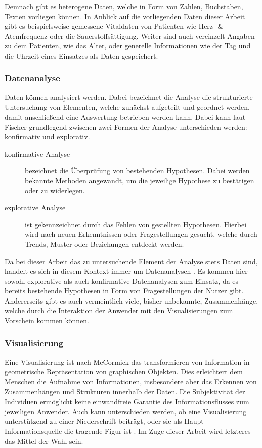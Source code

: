 Demnach gibt es heterogene Daten, welche in Form von Zahlen, Buchstaben, Texten vorliegen können.
In Anblick auf die vorliegenden Daten dieser Arbeit gibt es beispielsweise gemessene Vitaldaten von Patienten wie Herz- \& Atemfrequenz oder die Sauerstoffsättigung.
Weiter sind auch vereinzelt Angaben zu dem Patienten, wie das Alter, oder generelle Informationen wie der Tag und die Uhrzeit eines Einsatzes als Daten gespeichert.
 
\subsubsection{Datenanalyse}
\label{subsub:datenanalyse}
Daten können analysiert werden.
Dabei bezeichnet die Analyse die strukturierte Untersuchung von Elementen, welche zunächst aufgeteilt und geordnet werden, damit anschließend eine Auswertung betrieben werden kann.
Dabei kann laut Fischer \cite{Fischer.2014} grundlegend zwischen zwei Formen der Analyse unterschieden werden: konfirmativ und explorativ.
\begin{description}
\item[konfirmative Analyse] bezeichnet die Überprüfung von bestehenden Hypothesen.
Dabei werden bekannte Methoden angewandt, um die jeweilige Hypothese zu bestätigen oder zu widerlegen.
\item[explorative Analyse] ist gekennzeichnet durch das Fehlen von gestellten Hypothesen.
Hierbei wird nach neuen Erkenntnissen oder Fragestellungen gesucht, welche durch Trends, Muster oder Beziehungen entdeckt werden.
\end{description}

Da bei dieser Arbeit das zu untersuchende Element der Analyse stets Daten sind, handelt es sich in diesem Kontext immer um \glqq Datenanalysen\grqq{} \cite{Schumann.2000}.
Es kommen hier sowohl explorative als auch konfirmative Datenanalysen zum Einsatz, da es bereits bestehende Hypothesen in Form von Fragestellungen der Nutzer gibt.
Andererseits gibt es auch vermeintlich viele, bisher unbekannte, Zusammenhänge, welche durch die Interaktion der Anwender mit den Visualisierungen zum Vorschein kommen können.


\subsubsection{Visualisierung}
\label{subsub:visual}
Eine Visualisierung ist nach McCormick \cite{Mccormick.1987} das transformieren von Information in geometrische Repräsentation von graphischen Objekten.
Dies erleichtert dem Menschen die Aufnahme von Informationen, insbesondere aber das Erkennen von Zusammenhängen und Strukturen innerhalb der Daten.
Die Subjektivität der Individuen ermöglicht keine einwandfreie Garantie des Informationsflusses zum jeweiligen Anwender. %
Auch kann unterschieden werden, ob eine Visualisierung unterstützend zu einer Niederschrift beiträgt, oder sie als Haupt-Informationsquelle die tragende Figur ist \cite{Bassler.2010}.
Im Zuge dieser Arbeit wird letzteres das Mittel der Wahl sein.

